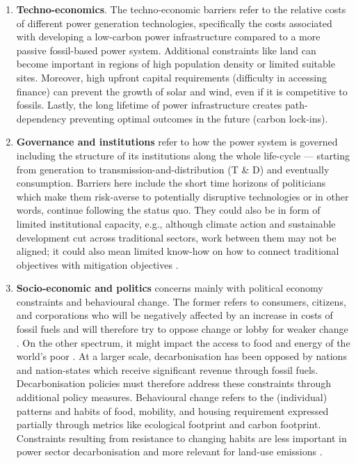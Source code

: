 \documentclass[../thesis.tex]{subfiles}
\begin{document}
\begin{enumerate}
\item \textbf{Techno-economics}. The techno-economic barriers refer to the relative costs of different power generation technologies, specifically the costs associated with developing a low-carbon power infrastructure compared to a more passive fossil-based power system. Additional constraints like land can become important in regions of high population density or limited suitable sites. Moreover, high upfront capital requirements (difficulty in accessing finance) can prevent the growth of solar and wind, even if it is competitive to fossils. Lastly, the long lifetime of power infrastructure creates path-dependency preventing optimal outcomes in the future (carbon lock-ins).

\item \textbf{Governance and institutions} refer to how the power system is governed including the structure of its institutions along the whole life-cycle --- starting from generation to transmission-and-distribution (T \& D) and eventually consumption. Barriers here include the short time horizons of politicians which make them risk-averse to potentially disruptive technologies or in other words, continue following the status quo. They could also be in form of limited institutional capacity, e.g., although climate action and sustainable development cut across traditional sectors, work between them may not be aligned; it could also mean limited know-how on how to connect traditional objectives with mitigation objectives \citep{dubash2019}.

\item \textbf{Socio-economic and politics} concerns mainly with political economy constraints and behavioural change. The former refers to consumers, citizens, and corporations who will be negatively affected by an increase in costs of fossil fuels and will therefore try to oppose change or lobby for weaker change \citep{jenkins2014}. On the other spectrum, it might impact the access to food and energy of the world's poor \citep{fujimori2019}. At a larger scale, decarbonisation has been opposed by nations and nation-states which receive significant revenue through fossil fuels. Decarbonisation policies must therefore address these constraints through additional policy measures. 
Behavioural change refers to the (individual) patterns and habits of food, mobility, and housing requirement expressed partially through metrics like ecological footprint and carbon footprint. Constraints resulting from resistance to changing habits are less important in power sector decarbonisation and more relevant for land-use emissions \citep{vandeven2018}.
\end{enumerate}
\end{document}
